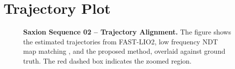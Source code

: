 \chapter{Trajectory Plot}
\label{appx:simulation}

\newpage

\begin{figure}[H]
	\centering
	\caption[Saxion Sequence 02– Trajectory Alignment with Zoomed Comparison]%
	{\textbf{Saxion Sequence 02 – Trajectory Alignment.} 
		The figure shows the estimated trajectories from FAST-LIO2, low frequency NDT map matching , and the proposed method, overlaid against ground truth. The red dashed box indicates the zoomed region.
	}
	\label{fig:saxion-seq2-trajectory-zoom}
	
	
\end{figure}

